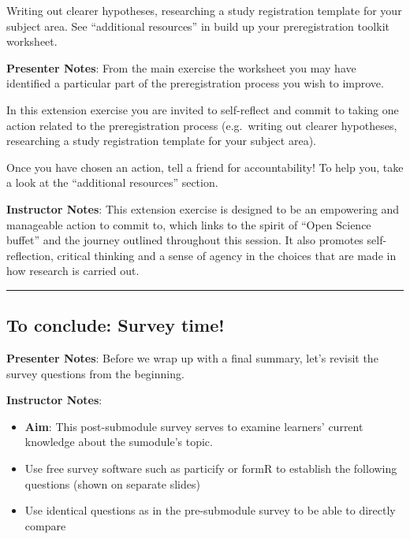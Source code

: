 \documentclass[
  letterpaper,
  DIV=11,
  numbers=noendperiod]{scrartcl}
\begin{document}
\begin{tcolorbox}[enhanced jigsaw, arc=.35mm, bottomrule=.15mm, bottomtitle=1mm, breakable, colback=white, colbacktitle=quarto-callout-tip-color!10!white, colframe=quarto-callout-tip-color-frame, coltitle=black, left=2mm, leftrule=.75mm, opacityback=0, opacitybacktitle=0.6, rightrule=.15mm, title=\textcolor{quarto-callout-tip-color}{\faLightbulb}\hspace{0.5em}{Possible actions}, titlerule=0mm, toprule=.15mm, toptitle=1mm]

Writing out clearer hypotheses, researching a study registration
template for your subject area. See ``additional resources'' in build up
your preregistration toolkit worksheet.

\end{tcolorbox}

\textbf{Presenter Notes}: From the main exercise the worksheet you may
have identified a particular part of the preregistration process you
wish to improve.

In this extension exercise you are invited to self-reflect and commit to
taking one action related to the preregistration process (e.g.~writing
out clearer hypotheses, researching a study registration template for
your subject area).

Once you have chosen an action, tell a friend for accountability! To
help you, take a look at the ``additional resources'' section.

\textbf{Instructor Notes}: This extension exercise is designed to be an
empowering and manageable action to commit to, which links to the spirit
of ``Open Science buffet'' and the journey outlined throughout this
session. It also promotes self-reflection, critical thinking and a sense
of agency in the choices that are made in how research is carried out.

\begin{center}\rule{0.5\linewidth}{0.5pt}\end{center}

\subsection{To conclude: Survey time!}\label{to-conclude-survey-time}

\textbf{Presenter Notes}: Before we wrap up with a final summary, let's
revisit the survey questions from the beginning.

\textbf{Instructor Notes}:

\begin{itemize}
\item
  \textbf{Aim}: This post-submodule survey serves to examine learners'
  current knowledge about the sumodule's topic.
\item
  Use free survey software such as particify or formR to establish the
  following questions (shown on separate slides)
\item
  Use identical questions as in the pre-submodule survey to be able to
  directly compare
\end{itemize}
\end{document}
